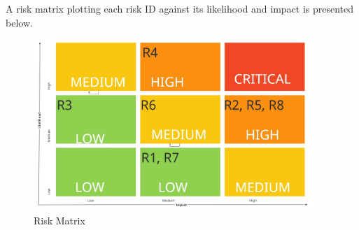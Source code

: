 \vspace{0.2 cm}
A risk matrix plotting each risk ID against its likelihood and impact is presented below.
\vspace{-0.4 cm}
\begin{figure}[H]
    \centering
    \includegraphics[width=400px]{appendices/images/Risk Matrix Template.jpg}
    \caption{Risk Matrix }
    \label{fig:Risk Matrix }
\end{figure}
\label{tab:risk_analysis}
